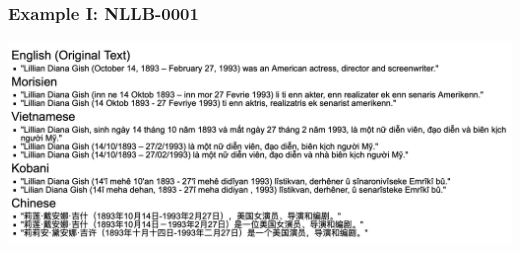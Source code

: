 \documentclass[aspectratio=169]{beamer}
\begin{document}
\begin{frame}[fragile]
	\frametitle{Example I: NLLB-0001}
    \includegraphics[width=\textwidth]{images/example-nllb-1.png}

\end{frame}
\end{document}
